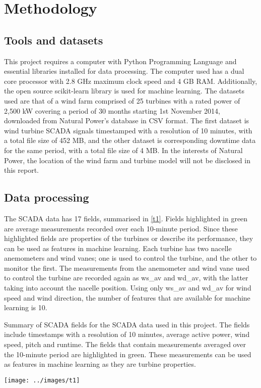\chapter{Methodology}\label{c2}

\section{Tools and datasets}

This project requires a computer with Python Programming Language \cite{Welco} and essential libraries installed for data processing. The computer used has a dual core processor with 2.8 GHz maximum clock speed and 4 GB RAM. Additionally, the open source scikit-learn library \cite{Pedre11} is used for machine learning. The datasets used are that of a wind farm comprised of 25 turbines with a rated power of 2,500 kW covering a period of 30 months starting 1st November 2014, downloaded from Natural Power's database in CSV format. The first dataset is wind turbine SCADA signals timestamped with a resolution of 10 minutes, with a total file size of 452 MB, and the other dataset is corresponding downtime data for the same period, with a total file size of 4 MB. In the interests of Natural Power, the location of the wind farm and turbine model will not be disclosed in this report.

\section{Data processing}

The SCADA data has 17 fields, summarised in \autoref{t1}. Fields highlighted in green are average measurements recorded over each 10-minute period. Since these highlighted fields are properties of the turbines or describe its performance, they can be used as features in machine learning. Each turbine has two nacelle anemometers and wind vanes; one is used to control the turbine, and the other to monitor the first. The measurements from the anemometer and wind vane used to control the turbine are recorded again as ws\_av and wd\_av, with the latter taking into account the nacelle position. Using only ws\_av and wd\_av for wind speed and wind direction, the number of features that are available for machine learning is 10.

\begin{table}
  \centering
  \caption{\label{t1}Summary of SCADA fields for the SCADA data used in this project. The fields include timestamps with a resolution of 10 minutes, average active power, wind speed, pitch and runtime. The fields that contain measurements averaged over the 10-minute period are highlighted in green. These measurements can be used as features in machine learning as they are turbine properties.}
  \texttt{[image: ../images/t1]}
\end{table}

